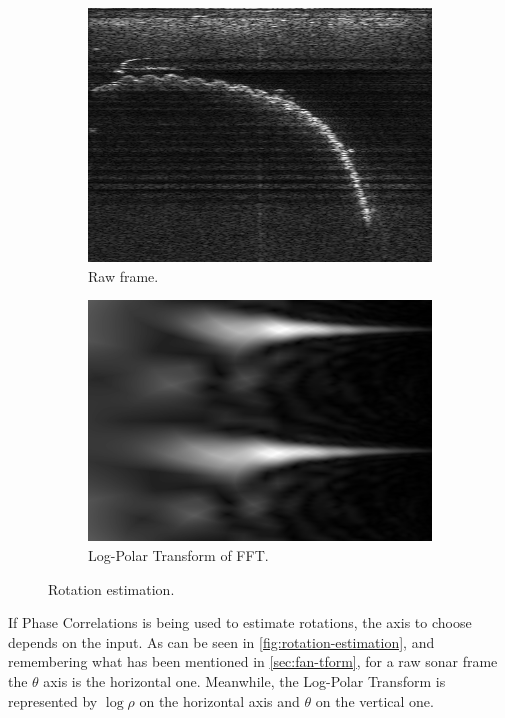\begin{figure}[H]
    \centering
    \begin{subfigure}[b]{.45\textwidth}
        \centering
        \includegraphics[width=\textwidth]{figures/pipeline/Original.png}
        \caption{Raw frame.}
    \end{subfigure}
    \hfill
    \begin{subfigure}[b]{.45\textwidth}
        \centering
        \includegraphics[width=\textwidth]{figures/pipeline/LogPolar.png}
        \caption{Log-Polar Transform of FFT.}
    \end{subfigure}
    \caption{Rotation estimation.}
    \label{fig:rotation-estimation}
\end{figure}

If Phase Correlations is being used to estimate rotations, the axis to choose depends on the input. As can be seen in \autoref{fig:rotation-estimation}, and remembering what has been mentioned in \autoref{sec:fan-tform}, for a raw sonar frame the \(\theta\) axis is the horizontal one. Meanwhile, the Log-Polar Transform is represented by \(\log{\rho}\) on the horizontal axis and \(\theta\) on the vertical one. 

